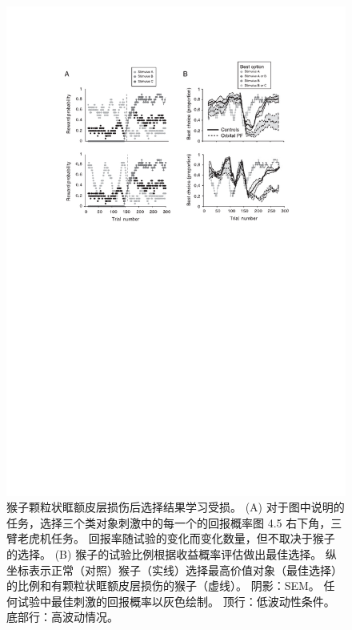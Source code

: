\begin{figure}[!htb]
	\centering
	\includegraphics{chap4/fig_4_6}
	\caption{猴子颗粒状眶额皮层损伤后选择结果学习受损。
		(A) 对于图中说明的任务，选择三个类对象刺激中的每一个的回报概率图 4.5 右下角，三臂老虎机任务。
		回报率随试验的变化而变化数量，但不取决于猴子的选择。
		(B) 猴子的试验比例根据收益概率评估做出最佳选择。 纵坐标表示正常（对照）猴子（实线）选择最高价值对象（最佳选择）的比例和有颗粒状眶额皮层损伤的猴子（虚线）。
		阴影：SEM。
		任何试验中最佳刺激的回报概率以灰色绘制。
		顶行：低波动性条件。
		底部行：高波动情况\cite{walton2010separable}。}
	\label{fig:fig_4_6}
\end{figure}


